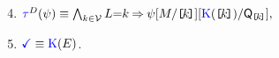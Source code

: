\begin{minipage}[t]{.56\textwidth}
  \begin{enumerate}[topsep=0pt,label=(\textsc{w}\arabic*),ref=\textsc{w}\arabic*]
    \setcounter{enumi}{3}
  \item \label{write-tau-addr}
    \begin{math}
      \aTr{\bEvs}{\bForm} \riff 
      \textstyle\bigwedge_{\dVal\in\Val}
      \cExp{=}\dVal
      \limplies
        \bForm
        [\aExp/\REF{\dVal}]
        [\kappaE{\REF{\dVal}}/\Q{\REF{\dVal}}],
      \end{math}
  \item \label{write-term-addr}
    $\aTerm \riff \kappaE{}$.
  \end{enumerate}
\end{minipage}
\smallskip

